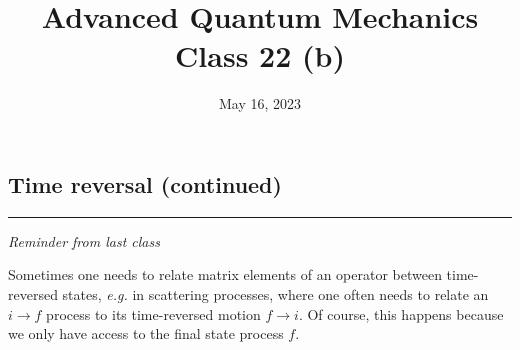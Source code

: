 \documentclass[12pt]{article}
\title{Advanced Quantum Mechanics\\Class 22 (b)}
\date{May 16, 2023}                                           %
\begin{document}
\maketitle

\subsection{Time reversal (continued)}

\par\noindent\rule{\textwidth}{1pt}
\emph{Reminder from last class}

Sometimes one needs to relate matrix elements of
an operator between time-reversed states, \textit{e.g.} in
scattering processes, where one often needs to relate
an $i \rightarrow f$ process to its time-reversed motion $f \rightarrow i$.
Of course, this happens because we only have access to the final state process $f$.
\end{document}
